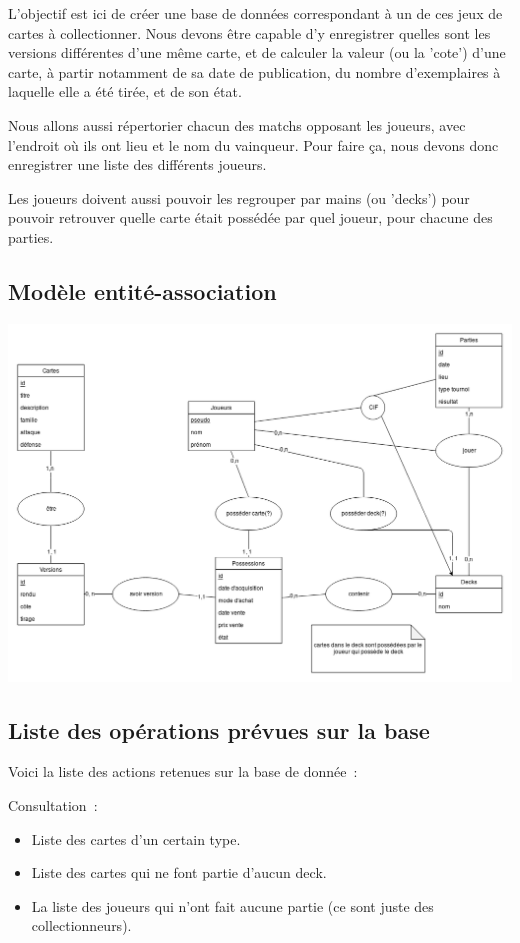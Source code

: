 \documentclass[a4paper,10.5pt]{article}
\begin{document}
L'objectif est ici de créer une base de données correspondant à un de ces jeux de cartes à collectionner. Nous devons être capable d'y enregistrer quelles sont les versions différentes d'une même carte, et de calculer la valeur (ou la 'cote') d'une carte, à partir notamment de sa date de publication, du nombre d'exemplaires à laquelle elle a été tirée, et de son état.

Nous allons aussi répertorier chacun des matchs opposant les joueurs, avec l'endroit où ils ont lieu et le nom du vainqueur. Pour faire ça, nous devons donc enregistrer une liste des différents joueurs.

Les joueurs doivent aussi pouvoir les regrouper par mains (ou 'decks') pour pouvoir retrouver quelle carte était possédée par quel joueur, pour chacune des parties.

\subsection{Modèle entité-association}

\includegraphics[width=\textwidth]{modele_conceptuel.png}

\subsection{Liste des opérations prévues sur la base}

Voici la liste des actions retenues sur la base de donnée~:

Consultation~:

\begin{itemize}
  \item Liste des cartes d’un certain type.
  \item Liste des cartes qui ne font partie d’aucun deck.
  \item La liste des joueurs qui n’ont fait aucune partie (ce sont juste des collectionneurs).
\end{itemize}
\end{document}
